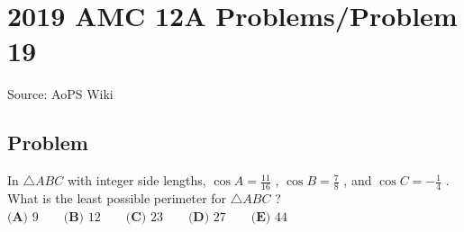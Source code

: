 \documentclass[12pt]{article}
\begin{document}
\section*{{2019 AMC 12A Problems/Problem 19}}
Source: AoPS Wiki

\subsection*{Problem}
In $\triangle ABC$ with integer side lengths, $\cos A = \frac{11}{16}$ , $\cos B = \frac{7}{8}$ , and $\cos C = -\frac{1}{4}$ . What is the least possible perimeter for $\triangle ABC$ ? $\textbf{(A) } 9 \qquad \textbf{(B) } 12 \qquad \textbf{(C) } 23 \qquad \textbf{(D) } 27 \qquad \textbf{(E) } 44$
\end{document}
